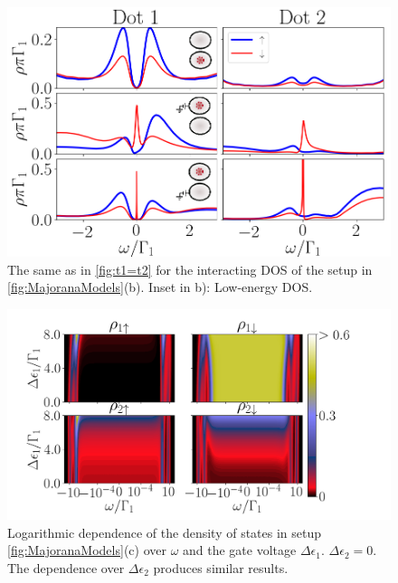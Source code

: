 \begin{figure}[bt]
\begin{center}
\includegraphics[scale=0.4]{IMAGES/NRG/t1>0.png}
\caption{  \label{fig:Nt1>0} The same as in \ref{fig:t1=t2} for the  interacting DOS of the setup in \ref{fig:MajoranaModels}(b). Inset in b): Low-energy DOS. \protect{}
}
%
\end{center}
\end{figure}

\begin{figure}[H]
    \centering
    \includegraphics[scale=0.4]{IMAGES/NRG/c)LogEv-ed1.png}
    \caption{\label{fig:logc}  Logarithmic dependence of the density of states in setup  \ref{fig:MajoranaModels}(c) over $\omega$ and the gate voltage $\Delta \epsilon_1$. $\Delta \epsilon_2=0$. The dependence over $\Delta \epsilon_2$ produces similar results. \protect{}}
\end{figure}



